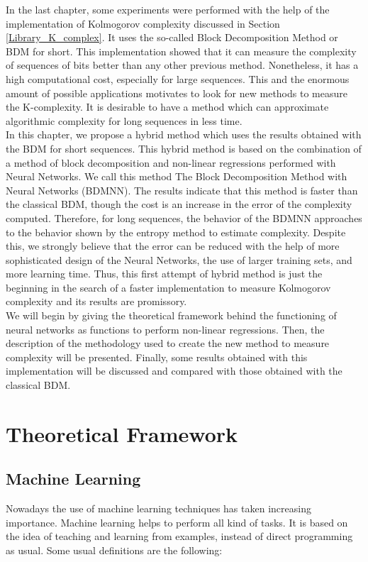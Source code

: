 \label{NN_proposal_chapter}
In the last chapter, some experiments were performed with the help of the implementation of Kolmogorov complexity discussed in Section \ref{Library_K_complex}. It uses the so-called Block Decomposition Method or BDM for short. This implementation showed that it can measure the complexity of sequences of bits better than any other previous method. Nonetheless, it has a high computational cost, especially for large sequences. This and the enormous amount of possible applications motivates to look for new methods to measure the K-complexity. It is desirable to have a method which can approximate algorithmic complexity for long sequences in less time.\\

In this chapter, we propose a hybrid method which uses the results obtained with the BDM for short sequences. This hybrid method is based on the combination of a method of block decomposition and non-linear regressions performed with Neural Networks. We call this method The Block Decomposition Method with Neural Networks (BDMNN). The results indicate that this method is faster than the classical BDM, though the cost is an increase in the error of the complexity computed. Therefore, for long sequences, the behavior of the BDMNN approaches to the behavior shown by the entropy method to estimate complexity. Despite this, we strongly believe that the error can be reduced with the help of more sophisticated design of the Neural Networks, the use of larger training sets, and more learning time. Thus, this first attempt of hybrid method is just the beginning in the search of a faster implementation to measure Kolmogorov complexity and its results are promissory.\\

We will begin by giving the theoretical framework behind the functioning of neural networks as functions to perform non-linear regressions. Then, the description of the methodology used to create the new method to measure complexity will be presented. Finally, some results obtained with this implementation will be discussed and compared with those obtained with the classical BDM.

\section{Theoretical Framework}
\subsection{Machine Learning}
Nowadays the use of machine learning techniques has taken increasing importance. Machine learning helps to perform all kind of tasks. It is based on the idea of teaching and learning from examples, instead of direct programming as usual. Some usual definitions are the following:

